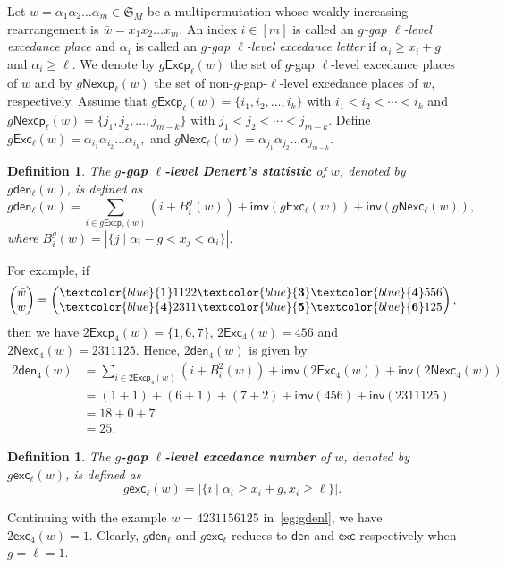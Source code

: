 \documentclass[12pt]{article}
\def\blue{\textcolor{blue}}
\def\blue{\textcolor{blue}}
\numberwithin{equation}{section}
\def\blue{\textcolor{blue}}
\def\blue{\textcolor{blue}}
\theoremstyle{plain}
\newtheorem{definition}[theorem]{Definition}
\def\exc{\mathsf{exc}}
\def\den{\mathsf{den}}
\def\Exc{\mathsf{Exc}}
\def\Nexc{\mathsf{Nexc}}
\def\Nexcp{\mathsf{Nexcp}}
\def\Excp{\mathsf{Excp}}
\def\inv{\mathsf{inv}}
\def\imv{\mathsf{imv}}
\begin{document}
	Let  $w=\alpha_1 \alpha_2 \ldots \alpha_m\in \mathfrak{S}_M$ be a multipermutation whose weakly increasing  rearrangement is $\bar{w}=x_1 x_2 \ldots x_m$. An index $i\in[m]$ is called an {\em $g$-gap $\ell$-level  excedance place}  and $\alpha_i$ is called an {\em $g$-gap $\ell$-level  excedance letter} if $\alpha_i\geq x_i+g$ and $\alpha_i\geq \ell$.   We denote by $g\Excp_\ell(w)$ the set of $g$-gap $\ell$-level excedance places of $w$ and by   $g\Nexcp_\ell(w)$   the set of non-$g$-gap-$\ell$-level excedance places of $w$, respectively.  
	Assume that  $g\Excp_\ell(w)=\{i_1, i_2, \ldots, i_k\}$ with $i_1<i_2<\cdots<i_k$ and  $g\Nexcp_\ell(w)=\{j_1, j_2, \ldots, j_{m-k}\}$
	with $j_1<j_2<\cdots<j_{m-k}$.  Define
	$ 
	g\Exc_\ell(w)=\alpha_{i_1}\alpha_{i_2}\ldots \alpha_{i_k},
	$ 
	and 
	$ 
	g\Nexc_\ell(w)=\alpha_{j_1}\alpha_{j_2}\ldots \alpha_{j_{m-k}}.
	$ 
		\begin{definition}
		The {\bf $g$-gap $\ell$-level  Denert's statistic} of $w$, denoted by $g\den_{\ell}(w)$, is defined as
		$$
		g\den_{\ell}(w)=\sum\limits_{i\in g\Excp_{\ell}(w)} (i+B^{g}_i(w)) +{\imv}(g\Exc_{\ell}(w))+{\inv}(g\Nexc_{\ell} (w)), 
		$$
		where $B^{g}_i(w)=|\{j \mid \alpha_i -g< x_j < \alpha_i\}|$.
	\end{definition}
For example, if  
\begin{equation}\label{eg:gdenl}
	\begin{pmatrix}
		\bar{w}\\
		w
	\end{pmatrix}
	=
	\begin{pmatrix}
		\blue{\bf1}1122\blue{\bf3}\blue{\bf4}556\\
		\blue{\bf4}2311\blue{\bf5}\blue{\bf6}125 
	\end{pmatrix},
\end{equation}	
then we have $2\Excp_4(w)=\{1,6,7\}$, $2\Exc_4(w)=456$ and $2\Nexc_4(w)=2311125$. Hence, $2\den_4(w)$ is given by
$$
\begin{array}{ll}
	2\den_4(w)&=\sum\limits_{i\in 2\Excp_4(w)} (i+B^{2}_i(w)) +{\imv}(2\Exc_4(w))+{\inv}(2\Nexc_4 (w))\\
	&=(1+1)+(6+1)+(7+2)+{\imv}(456)+{\inv}(2311125)\\
	&=18+0+7\\
	&=25.
\end{array}
$$	
	\begin{definition}
		The {\bf  $g$-gap $\ell$-level excedance number} of $w$,  denoted by $g\exc_\ell(w)$,  is defined as
		$$g\exc_\ell(w)=|\{i\mid \alpha_i\geq x_i+g, x_i\geq \ell\}|.$$ 
	\end{definition}
Continuing with the example $w=4231156125$ in~\eqref{eg:gdenl}, we have $2\exc_4(w)=1$.
Clearly, $g\den_\ell$ and $g\exc_\ell$ reduces to  $\den$ and $\exc$ respectively  when $g=\ell=1$.  
\end{document}
